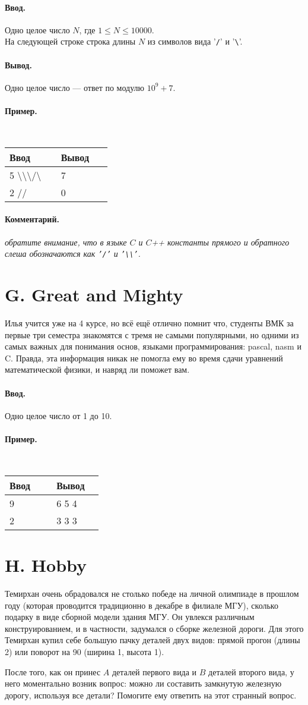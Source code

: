 \documentclass[12pt, a5paper]{article}
\newcommand{\informat}[1]
{
	\paragraph{Ввод.\\} #1
}
\newcommand{\outformat}[1]
{
	\paragraph{Вывод.\\} #1
}
\newcommand{\examplee}[4]
{
	\paragraph{Пример.\\}
	{\tt
	\begin{tabular}{|p{0.4\linewidth}|p{0.4\linewidth}|}
	\hline
	Ввод 	& Вывод  	\\
	\hline
	#1 		& #2 		\\
	\hline
	#3		& #4		\\
	\hline
	\end{tabular}
	}
}
\newcommand{\excomm}[1]
{
	\paragraph{Комментарий. \\}
	\textit{#1}
}
\begin{document}
\informat{Одно целое число $N$, где $1 \le N \le 10000$. \\
На следующей строке строка длины $N$ из символов вида  '{\tt /}' и '{\tt \textbackslash}'.}

\outformat{Одно целое число --- ответ по модулю $10^9+7$.}

\examplee{
5 \newline
\textbackslash\textbackslash\textbackslash/\textbackslash}
{7}
{2 \newline
//}
{0}

\excomm{обратите внимание, что в языке $C$ и $C$++ константы прямого и обратного слеша обозначаются как {\tt '/'} и {\tt '\textbackslash\textbackslash'}.}



\section*{G. Great and Mighty}

Илья учится уже на 4 курсе, но всё ещё отлично помнит что, студенты ВМК за первые три семестра знакомятся с тремя не самыми популярными, но одними из самых важных для понимания основ, языками программирования: pascal, nasm и C. Правда, эта информация никак не помогла ему во время сдачи уравнений математической физики, и навряд ли поможет вам.

\informat{Одно целое число от 1 до 10.}

\examplee{9}{6 5 4}{2}{3 3 3}



\section*{H. Hobby}

Темирхан очень обрадовался не столько победе на личной олимпиаде в прошлом году (которая проводится традиционно в декабре в филиале МГУ), сколько подарку в виде сборной модели здания МГУ. Он увлекся различным конструированием, и в частности, задумался о сборке железной дороги. Для этого Темирхан купил себе большую пачку деталей двух видов: прямой прогон (длины 2) или поворот на 90 (ширина 1, высота 1). 



После того, как он принес $A$ деталей первого вида и $B$ деталей второго вида, у него моментально возник вопрос: можно ли составить замкнутую железную дорогу, используя все детали? Помогите ему ответить на этот странный вопрос.
\end{document}
